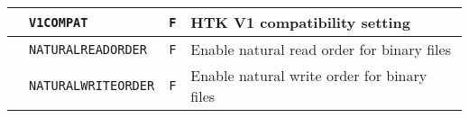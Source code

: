\begin{center}
\begin{supertabular}{|p{1.4cm}|l|l|p{6.6cm}|}
   
  & \texttt{V1COMPAT} & \texttt{F} & HTK V1 compatibility setting \\ \hline



  & \texttt{NATURALREADORDER} & \texttt{F} & Enable natural read order for binary files \\  
  & \texttt{NATURALWRITEORDER} & \texttt{F} & Enable natural write order for binary files \\ \hline


\end{supertabular}
\end{center}
